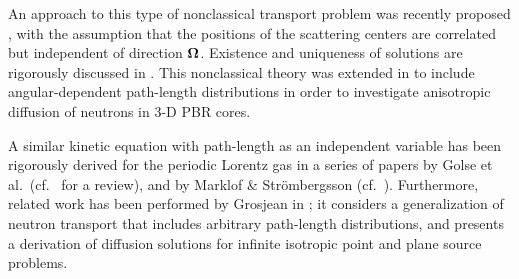 \documentclass[12pt]{article}
\newcommand{\uomega}{{\bf \Omega}}
\begin{document}
An approach to this type of nonclassical transport problem was recently proposed \cite{lar07,larvas11}, with the assumption that the positions of the scattering
centers are correlated but independent of direction $\uomega$.
Existence and uniqueness of solutions are rigorously discussed in \cite{fra10}.
This nonclassical theory was extended in \cite{vaslar14a} to include angular-dependent path-length distributions in order to investigate anisotropic diffusion of neutrons in 3-D PBR cores.

A similar kinetic equation with path-length as an independent variable has been rigorously derived for the periodic Lorentz gas in a series of papers by Golse et al.~(cf.~\cite{gol12} for a review), and by Marklof \& Str\"ombergsson (cf.~\cite{mar11,mar15}).
Furthermore, related work has been performed by Grosjean in \cite{gro51}; it considers a generalization of neutron transport that includes arbitrary path-length distributions, and presents a derivation of diffusion solutions for infinite isotropic point and plane source problems.
 
\end{document}
